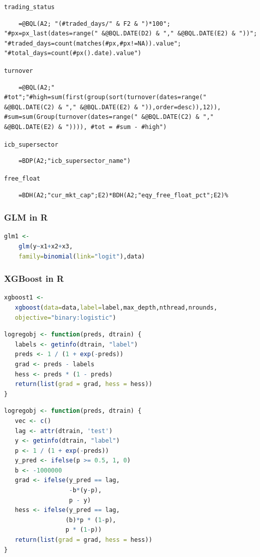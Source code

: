 \texttt{trading\_status}
\begin{lstlisting}
    =@BQL(A2; "(#traded_days/" & F2 & ")*100"; "#px=px_last(dates=range(" &@BQL.DATE(D2) & "," &@BQL.DATE(E2) & "))"; "#traded_days=count(matches(#px,#px!=NA)).value"; "#total_days=count(#px().date).value")
\end{lstlisting}

\texttt{turnover}
\begin{lstlisting}
    =@BQL(A2;" #tot";"#high=sum(first(group(sort(turnover(dates=range(" &@BQL.DATE(C2) & "," &@BQL.DATE(E2) & ")),order=desc)),12)), #sum=sum(Group(turnover(dates=range(" &@BQL.DATE(C2) & "," &@BQL.DATE(E2) & ")))), #tot = #sum - #high")
\end{lstlisting}

\texttt{icb\_supersector}
\begin{lstlisting}
    =BDP(A2;"icb_supersector_name")
\end{lstlisting}

\texttt{free\_float}
\begin{lstlisting}
    =BDH(A2;"cur_mkt_cap";E2)*BDH(A2;"eqy_free_float_pct";E2)%
\end{lstlisting}



\subsubsection{GLM in R}
\begin{lstlisting}[language=R]
glm1 <- 
    glm(y~x1+x2+x3, 
    family=binomial(link="logit"),data)
\end{lstlisting}

\subsubsection{XGBoost in R}
\begin{lstlisting}[language=R]
xgboost1 <- 
   xgboost(data=data,label=label,max_depth,nthread,nrounds,
   objective="binary:logistic")
\end{lstlisting}

\begin{lstlisting}[language=R]
logregobj <- function(preds, dtrain) {
   labels <- getinfo(dtrain, "label")
   preds <- 1 / (1 + exp(-preds))
   grad <- preds - labels
   hess <- preds * (1 - preds)
   return(list(grad = grad, hess = hess))
}
\end{lstlisting}

\begin{lstlisting}[language=R]
logregobj <- function(preds, dtrain) {
   vec <- c()
   lag <- attr(dtrain, 'test')
   y <- getinfo(dtrain, "label")
   p <- 1 / (1 + exp(-preds))
   y_pred <- ifelse(p >= 0.5, 1, 0)
   b <- -1000000
   grad <- ifelse(y_pred == lag,
                  -b*(y-p),
                  p - y)
   hess <- ifelse(y_pred == lag,
                 (b)*p * (1-p),
                 p * (1-p))
   return(list(grad = grad, hess = hess))
}
\end{lstlisting}




